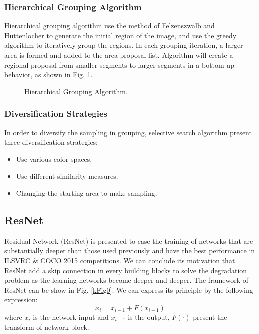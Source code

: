 \documentclass[conference]{IEEEtran}
\begin{document}
\subsubsection{Hierarchical Grouping Algorithm}

Hierarchical grouping algorithm use the method of Felzenszwalb and Huttenlocher to generate the initial region of the image, and use the greedy algorithm to iteratively group the regions. In each grouping iteration, a larger area is formed and added to the area proposal list. Algorithm will create a regional proposal from smaller segments to larger segments in a bottom-up behavior, as shown in Fig. \ref{kFig1}.
\begin{center}
	\begin{figure}
		\centering
		\caption{Hierarchical Grouping Algorithm.\cite{2013Selective}}
		\label{kFig1}
	\end{figure}
\end{center}
\subsubsection{Diversification Strategies}
In order to diversify the sampling in grouping, selective search algorithm present three diversification strategies:
\begin{itemize}
\item Use various color spaces.
\item Use different similarity measures.
\item Changing the starting area to make sampling.
\end{itemize}


\subsection{ResNet}
Residual Network (ResNet) \cite{He2016Deep} is presented to ease the training of networks that are substantially deeper than those used previously and have the best performance in ILSVRC \& COCO 2015 competitions. We can conclude its motivation that ResNet add a skip connection in every building blocks to solve the degradation problem as the learning networks become deeper and deeper. The framework of ResNet can be show in Fig. \ref{kFig0}. We can express its principle by the following expression:
$$x_{i}=x_{i-1}+F(x_{i-1})$$
where $x_{i}$ is the network input and $x_{i-1}$ is the output, $F(\cdot)$ present the transform of network block.
\end{document}
